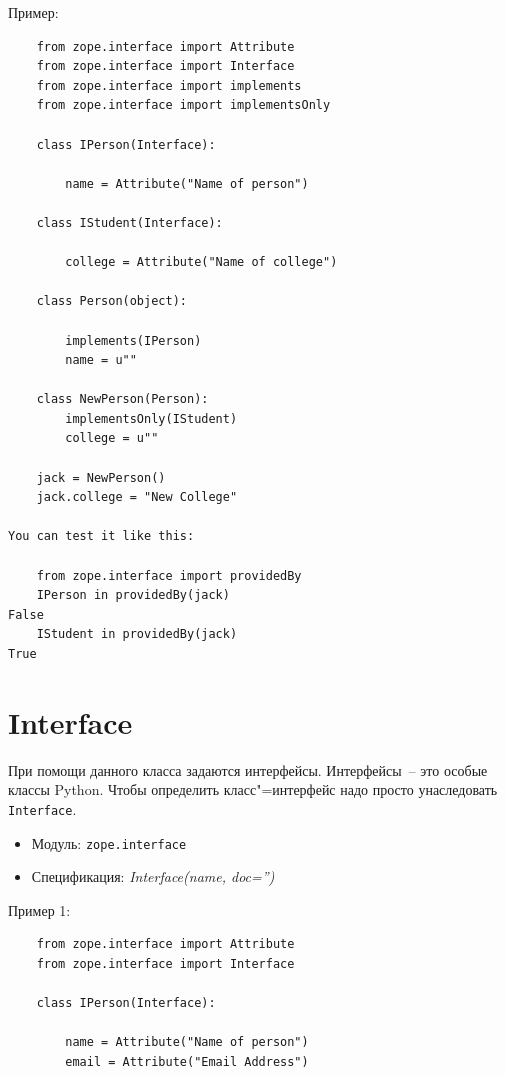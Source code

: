 \documentclass[a4paper,openany,twoside,final]{book}
\providecommand*{\DUroletitlereference}[1]{\textsl{#1}}
\begin{document}
Пример:

\begin{verbatim}
    from zope.interface import Attribute
    from zope.interface import Interface
    from zope.interface import implements
    from zope.interface import implementsOnly

    class IPerson(Interface):

        name = Attribute("Name of person")

    class IStudent(Interface):

        college = Attribute("Name of college")

    class Person(object):

        implements(IPerson)
        name = u""

    class NewPerson(Person):
        implementsOnly(IStudent)
        college = u""

    jack = NewPerson()
    jack.college = "New College"

You can test it like this:

    from zope.interface import providedBy
    IPerson in providedBy(jack)
False
    IStudent in providedBy(jack)
True
\end{verbatim}


\section*{Interface%
  \label{interface}%
}

При помощи данного класса задаются интерфейсы. Интерфейсы~-- это особые классы Python.  Чтобы определить класс"=интерфейс надо просто унаследовать \texttt{Interface}.

\begin{itemize}

\item Модуль: \texttt{zope.interface}

\item Спецификация: \DUroletitlereference{Interface(name, doc='')}

\end{itemize}

Пример 1:

\begin{verbatim}
    from zope.interface import Attribute
    from zope.interface import Interface

    class IPerson(Interface):

        name = Attribute("Name of person")
        email = Attribute("Email Address")
\end{verbatim}
\end{document}
